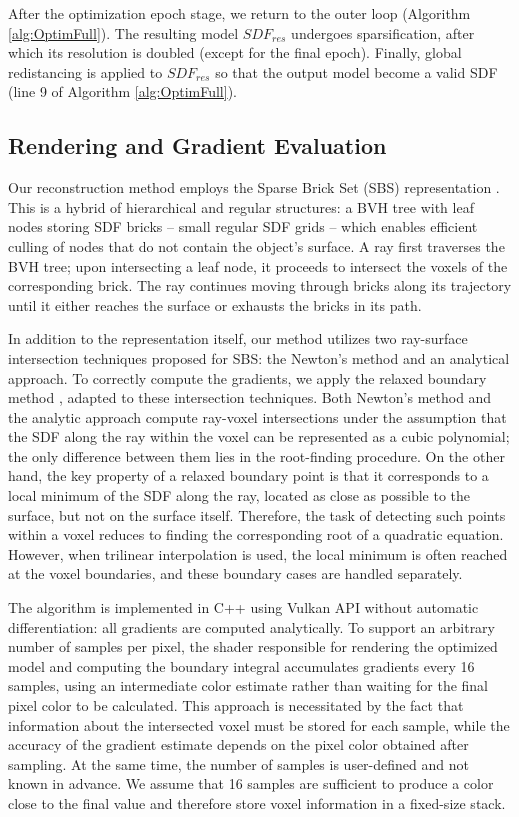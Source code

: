 \documentclass{ieeeaccess}
\begin{document}
After the optimization epoch stage, we return to the outer loop (Algorithm \ref{alg:OptimFull}). The resulting model $SDF_{res}$ undergoes sparsification, after which  its resolution is doubled (except for the final epoch). Finally, global redistancing is applied to $SDF_{res}$ so that the output model become a valid SDF (line 9 of Algorithm \ref{alg:OptimFull}).

\subsection{Rendering and Gradient Evaluation}

Our reconstruction method employs the Sparse Brick Set (SBS) representation \cite{HanssonSoderlund}. This is a hybrid of hierarchical and regular structures: a BVH tree with leaf nodes storing SDF bricks -- small regular SDF grids -- which enables efficient culling of nodes that do not contain the object's surface. A ray first traverses the BVH tree; upon intersecting a leaf node, it proceeds to intersect the voxels of the corresponding brick. The ray continues moving through bricks along its trajectory until it either reaches the surface or exhausts the bricks in its path.

In addition to the representation itself, our method utilizes two ray-surface intersection techniques proposed for SBS: the Newton's method and an analytical approach. To correctly compute the gradients, we apply the relaxed boundary method \cite{RelaxBoundary}, adapted to these intersection techniques. Both Newton's method and the analytic approach compute ray-voxel intersections under the assumption that the SDF along the ray within the voxel can be represented as a cubic polynomial; the only difference between them lies in the root-finding procedure. On the other hand, the key property of a relaxed boundary point is that it corresponds to a local minimum of the SDF along the ray, located as close as possible to the surface, but not on the surface itself. Therefore, the task of detecting such points within a voxel reduces to finding the corresponding root of a quadratic equation. However, when trilinear interpolation is used, the local minimum is often reached at the voxel boundaries, and these boundary cases are handled separately.

The algorithm is implemented in C++ using Vulkan API without automatic differentiation: all gradients are computed analytically. To support an arbitrary number of samples per pixel, the shader responsible for rendering the optimized model and computing the boundary integral accumulates gradients every 16 samples, using an intermediate color estimate rather than waiting for the final pixel color to be calculated. This approach is necessitated by the fact that information about the intersected voxel must be stored for each sample, while the accuracy of the gradient estimate depends on the pixel color obtained after sampling. At the same time, the number of samples is user-defined and not known in advance. We assume that 16 samples are sufficient to produce a color close to the final value and therefore store voxel information in a fixed-size stack.
\end{document}
